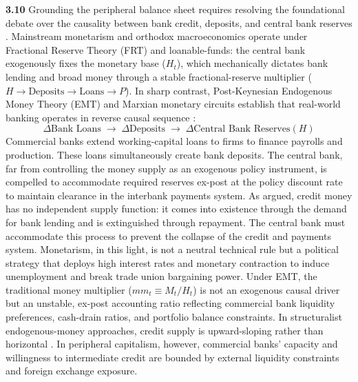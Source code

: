 \textbf{3.10} Grounding the peripheral balance sheet requires resolving the foundational debate over the causality between bank credit, deposits, and central bank reserves \citep{RochonRossi2013,Lavoie2014}. Mainstream monetarism and orthodox macroeconomics operate under Fractional Reserve Theory (FRT) and loanable-funds: the central bank exogenously fixes the monetary base ($H_t$), which mechanically dictates bank lending and broad money through a stable fractional-reserve multiplier ($H \to \text{Deposits} \to \text{Loans} \to P$). In sharp contrast, Post-Keynesian Endogenous Money Theory (EMT) and Marxian monetary circuits establish that real-world banking operates in reverse causal sequence \citep{Kaldor1982,Lavoie2014}:
\begin{equation}
	\Delta \text{Bank Loans} \;\longrightarrow\; \Delta \text{Deposits} \;\longrightarrow\; \Delta \text{Central Bank Reserves} (H)
	\label{eq:endogenous_money_sequence}
\end{equation}
Commercial banks extend working-capital loans to firms to finance payrolls and production. These loans simultaneously create bank deposits. The central bank, far from controlling the money supply as an exogenous policy instrument, is compelled to accommodate required reserves ex-post at the policy discount rate to maintain clearance in the interbank payments system. As \citet{Kaldor1982} argued, credit money has no independent supply function: it comes into existence through the demand for bank lending and is extinguished through repayment. The central bank must accommodate this process to prevent the collapse of the credit and payments system. Monetarism, in this light, is not a neutral technical rule but a political strategy that deploys high interest rates and monetary contraction to induce unemployment and break trade union bargaining power. Under EMT, the traditional money multiplier ($mm_t \equiv M_t / H_t$) is not an exogenous causal driver but an unstable, ex-post accounting ratio reflecting commercial bank liquidity preferences, cash-drain ratios, and portfolio balance constraints. In structuralist endogenous-money approaches, credit supply is upward-sloping rather than horizontal \citep{Dow2006,Rochon1999}. In peripheral capitalism, however, commercial banks' capacity and willingness to intermediate credit are bounded by external liquidity constraints and foreign exchange exposure.

